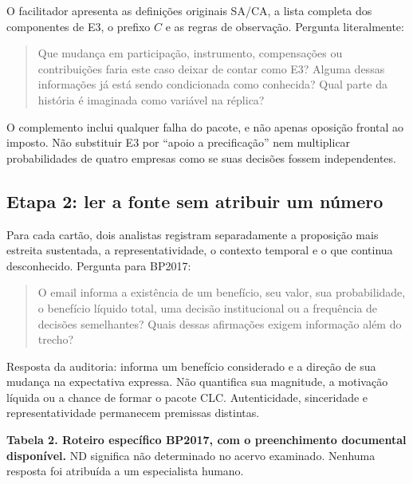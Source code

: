 \documentclass[
  brazilian,
  11pt,
  a4paper,
]{article}
\begin{document}
O facilitador apresenta as definições originais SA/CA, a lista completa
dos componentes de E3, o prefixo \(C\) e as regras de observação.
Pergunta literalmente:

\begin{quote}
Que mudança em participação, instrumento, compensações ou contribuições
faria este caso deixar de contar como E3? Alguma dessas informações já
está sendo condicionada como conhecida? Qual parte da história é
imaginada como variável na réplica?
\end{quote}

O complemento inclui qualquer falha do pacote, e não apenas oposição
frontal ao imposto. Não substituir E3 por ``apoio a precificação'' nem
multiplicar probabilidades de quatro empresas como se suas decisões
fossem independentes.

\subsection{Etapa 2: ler a fonte sem atribuir um
número}\label{etapa-2-ler-a-fonte-sem-atribuir-um-nuxfamero}

Para cada cartão, dois analistas registram separadamente a proposição
mais estreita sustentada, a representatividade, o contexto temporal e o
que continua desconhecido. Pergunta para BP2017:

\begin{quote}
O email informa a existência de um benefício, seu valor, sua
probabilidade, o benefício líquido total, uma decisão institucional ou a
frequência de decisões semelhantes? Quais dessas afirmações exigem
informação além do trecho?
\end{quote}

Resposta da auditoria: informa um benefício considerado e a direção de
sua mudança na expectativa expressa. Não quantifica sua magnitude, a
motivação líquida ou a chance de formar o pacote CLC. Autenticidade,
sinceridade e representatividade permanecem premissas distintas.

\textbf{Tabela 2. Roteiro específico BP2017, com o preenchimento
documental disponível.} ND significa não determinado no acervo
examinado. Nenhuma resposta foi atribuída a um especialista humano.
\end{document}
